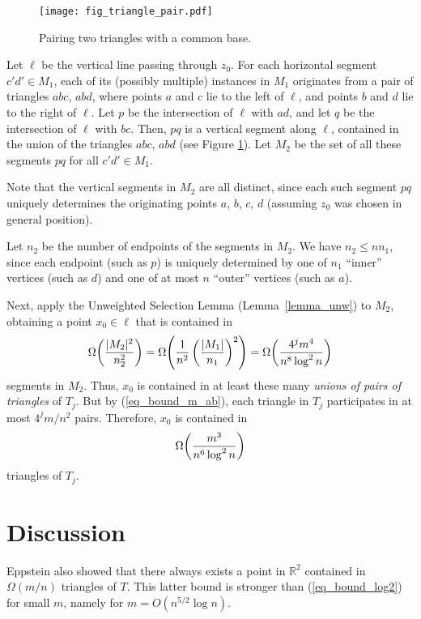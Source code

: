\documentclass[11pt]{article}
\begin{document}
\begin{figure}
\centerline{\texttt{[image: fig\_triangle\_pair.pdf]}}
\caption{\label{fig_triangle_pair} Pairing two triangles with a
common base.}
\end{figure}

Let $\ell$ be the vertical line passing through $z_0$. For each
horizontal segment $c'd' \in M_1$, each of its (possibly multiple)
instances in $M_1$ originates from a pair of triangles $abc$, $abd$,
where points $a$ and $c$ lie to the left of $\ell$, and points $b$
and $d$ lie to the right of $\ell$. Let $p$ be the intersection of
$\ell$ with $ad$, and let $q$ be the intersection of $\ell$ with
$bc$. Then, $pq$ is a vertical segment along $\ell$, contained in
the union of the triangles $abc$, $abd$ (see Figure
\ref{fig_triangle_pair}). Let $M_2$ be the set of all these segments
$pq$ for all $c'd' \in M_1$.

Note that the vertical segments in $M_2$ are all distinct, since
each such segment $pq$ uniquely determines the originating points
$a$, $b$, $c$, $d$ (assuming $z_0$ was chosen in general position).

Let $n_2$ be the number of endpoints of the segments in $M_2$. We
have $n_2 \le n n_1$, since each endpoint (such as $p$) is uniquely
determined by one of $n_1$ ``inner'' vertices (such as $d$) and one
of at most $n$ ``outer'' vertices (such as $a$).

Next, apply the Unweighted Selection Lemma (Lemma~\ref{lemma_unw})
to $M_2$, obtaining a point $x_0\in \ell$ that is contained in
\begin{equation*}
\Omega{\left({ |M_2| ^2 \over n_2^2 }\right)} = \Omega{\left(
{1\over n^2} \left({ |M_1| \over n_1 }\right)^2 \right)} =
\Omega{\left({ 4^j m^4 \over n^8 \log^2 n }\right)}
\end{equation*}
segments in $M_2$. Thus, $x_0$ is contained in at least these many
\emph{unions of pairs of triangles} of $T_j$. But by
(\ref{eq_bound_m_ab}), each triangle in $T_j$ participates in at
most $4^j m / n^2$ pairs. Therefore, $x_0$ is contained in
\begin{equation*}
\Omega{\left({ m^3 \over n^6 \log^2 n }\right)}
\end{equation*}
triangles of $T_j$.

\section{Discussion}

Eppstein \cite{eppstein} also showed that there always exists a
point in $\mathbb R^2$ contained in $\Omega(m/n)$ triangles of $T$.
This latter bound is stronger than (\ref{eq_bound_log2}) for small
$m$, namely for $m = O(n^{5/2} \log n)$.
\end{document}
